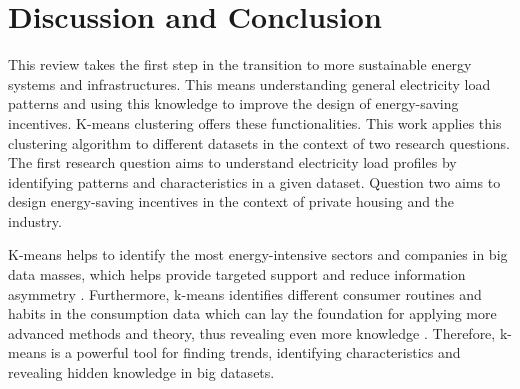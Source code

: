 


\section{Discussion and Conclusion}
\label{cha:discussionAndConclusion}

This review takes the first step in the transition to more sustainable energy systems and infrastructures.
This means understanding general electricity load patterns and using this knowledge to improve the design of energy-saving incentives.
K-means clustering offers these functionalities.
This work applies this clustering algorithm to different datasets in the context of two research questions.
The first research question aims to understand electricity load profiles by identifying patterns and characteristics in a given dataset.
Question two aims to design energy-saving incentives in the context of private housing and the industry.

K-means helps to identify the most energy-intensive sectors and companies in big data masses, which helps provide targeted support and reduce information asymmetry \cite{LIU-BDE}.
Furthermore, k-means identifies different consumer routines and habits in the consumption data which can lay the foundation for applying more advanced methods and theory, thus revealing even more knowledge \cite{MAL-HBP}.
Therefore, k-means is a powerful tool for finding trends, identifying characteristics and revealing hidden knowledge in big datasets.

